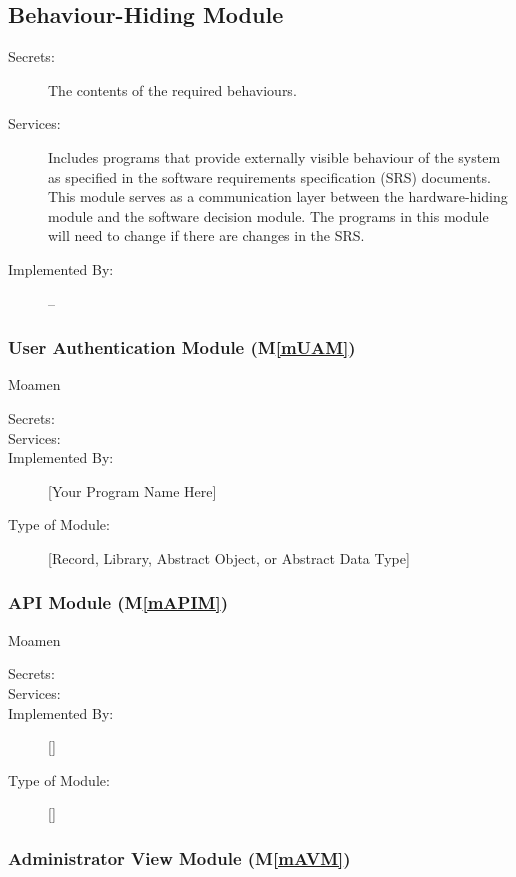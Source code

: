\documentclass[12pt, titlepage]{article}
\newcommand{\mref}[1]{M\ref{#1}}
\begin{document}
\subsection{Behaviour-Hiding Module}

\begin{description}
\item[Secrets:]The contents of the required behaviours.
\item[Services:]Includes programs that provide externally visible behaviour of the system as specified in the software requirements specification (SRS) documents. This module serves as a communication layer between the hardware-hiding module and the software decision module. The programs in this module will need to change if there are changes in the SRS.
\item[Implemented By:] --
\end{description}

\subsubsection{User Authentication Module (\mref{mUAM})} Moamen

\begin{description}
\item[Secrets:]
\item[Services:]
\item[Implemented By:] [Your Program Name Here]
\item[Type of Module:] [Record, Library, Abstract Object, or Abstract Data Type]
  
\end{description}

\subsubsection{API Module (\mref{mAPIM})} Moamen

\begin{description}
\item[Secrets:]
\item[Services:]
\item[Implemented By:] []
\item[Type of Module:] []
\end{description}

\subsubsection{Administrator View Module (\mref{mAVM})}
\end{document}
